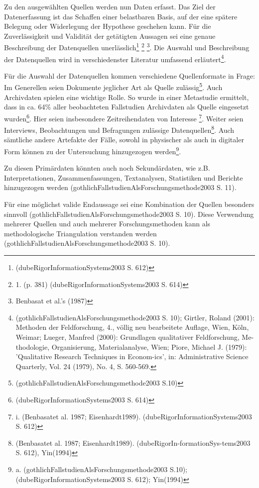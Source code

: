 Zu den ausgewählten Quellen werden nun Daten erfasst. Das Ziel der
Datenerfassung ist das Schaffen einer belastbaren Basis, auf der eine
spätere Belegung oder Widerlegung der Hypothese geschehen kann. Für die
Zuverlässigkeit und Validität der getätigten Aussagen sei eine genaue
Beschreibung der Datenquellen unerlässlich\footnote{(dubeRigorInformationSystems2003
  S. 612)} \footnote{1. (p. 381) (dubeRigorInformationSystems2003 S.
  614)} \footnote{Benbasat et al.'s (1987)}. Die Auswahl und
Beschreibung der Datenquellen wird in verschiedenster Literatur
umfassend erläutert\footnote{(gothlichFallstudienAlsForschungsmethode2003
  S. 10); Girtler, Roland (2001): Methoden der Feldforschung, 4., völlig
  neu bearbeitete Auflage, Wien, Köln, Weimar; Lueger, Manfred (2000):
  Grundlagen qualitativer Feldforschung, Me-thodologie, Organisierung,
  Materialanalyse, Wien; Piore, Michael J. (1979): 'Qualitative Research
  Techniques in Econom-ics', in: Administrative Science Quarterly, Vol.
  24 (1979), No. 4, S. 560-569.}.

  Für die Auswahl der Datenquellen kommen verschiedene Quellenformate in
Frage: Im Generellen seien Dokumente jeglicher Art als Quelle
zulässig\footnote{(gothlichFallstudienAlsForschungsmethode2003 S.10)}.
Auch Archivdaten spielen eine wichtige Rolle. So wurde in einer
Metastudie ermittelt, dass in ca. 64\% aller beobachteten Fallstudien
Archivdaten als Quelle eingesetzt wurden\footnote{(dubeRigorInformationSystems2003
  S. 614)}. Hier seien insbesondere Zeitreihendaten von Interesse
\footnote{i. (Benbasatet al. 1987; Eisenhardt1989).
  (dubeRigorInformationSystems2003 S. 612)}. Weiter seien Interviews,
Beobachtungen und Befragungen zulässige Datenquellen\footnote{(Benbasatet
  al. 1987; Eisenhardt1989). (dubeRigorIn-formationSys-tems2003 S. 612),
  Yin(1994)}. Auch sämtliche andere Artefakte der Fälle, sowohl in
physischer als auch in digitaler Form können zu der Untersuchung
hinzugezogen werden\footnote{a.
  (gothlichFallstudienAlsForschungsmethode2003 S.10);
  (dubeRigorInformationSystems2003 S. 612); Yin(1994)}.

Zu diesen Primärdaten könnten auch noch Sekundärdaten, wie z.B.
Interpretationen, Zusammenfassungen, Textanalysen, Statistiken und
Berichte hinzugezogen werden
(gothlichFallstudienAlsForschungsmethode2003 S. 11).

Für eine möglichst valide Endaussage sei eine Kombination der Quellen
besonders sinnvoll (gothlichFallstudienAlsForschungsmethode2003 S. 10).
Diese Verwendung mehrerer Quellen und auch mehrerer Forschungsmethoden
kann als methodologische Triangulation verstanden werden
(gothlichFallstudienAlsForschungsmethode2003 S. 10).


